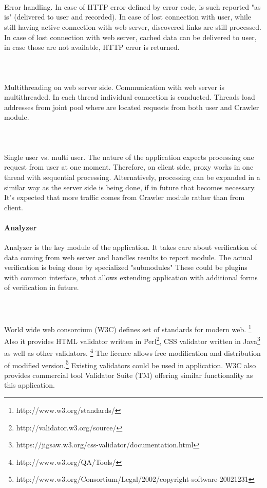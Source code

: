 \documentclass[10pt]{article}
\begin{document}
\paragraph{~}Error handling. In case of HTTP error defined by error code, is such reported "as is" (delivered to user and recorded). In case of lost connection with user, while still having active connection with web server,  discovered links are still processed. In case of lost connection with web server, cached data can be delivered to user, in case those are not available, HTTP error is returned.
\paragraph{~}Multithreading on web server side. Communication with web server is  multithreaded. In each thread individual connection is conducted. Threads load addresses from joint pool where are located requests from both user and Crawler module.
\paragraph{~}Single user vs. multi user. The nature of the application expects processing one request from user at one moment. Therefore, on client side, proxy works in one thread with sequential processing. Alternatively, processing can be expanded in a similar way as the server side is being done, if in future that becomes necessary. It's expected that more traffic comes from Crawler module rather than from client.
\paragraph{Analyzer} Analyzer is the key module of the application. It takes care about verification of data coming from web server and handles results to report module. The actual verification is being done by specialized "submodules" These could be plugins with common interface, what allows extending application with additional forms of verification in future.
\paragraph{~}World wide web consorcium (W3C) defines set of standards  for modern web. \footnote{http://www.w3.org/standards/} Also it provides HTML validator written in Perl\footnote{http://validator.w3.org/source/}, CSS validator written in Java\footnote{https://jigsaw.w3.org/css-validator/documentation.html} as well as other validators. \footnote{http://www.w3.org/QA/Tools/} The licence allows free modification and distribution of modified version.\footnote{http://www.w3.org/Consortium/Legal/2002/copyright-software-20021231} Existing validators could be used in application. W3C also provides commercial tool Validator Suite (TM) offering similar functionality as this application.
\end{document}
